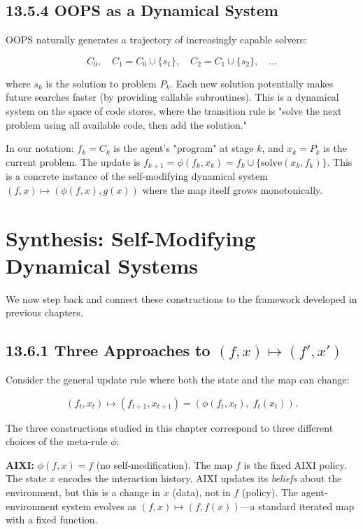 \subsection{13.5.4 OOPS as a Dynamical System}

OOPS naturally generates a trajectory of increasingly capable solvers:

\[C_0, \quad C_1 = C_0 \cup \{ s_1\} , \quad C_2 = C_1 \cup \{ s_2\} , \quad \ldots\]

where $s_k$ is the solution to problem $P_k$. Each new solution potentially makes future searches faster (by providing callable subroutines). This is a dynamical system on the space of code stores, where the transition rule is "solve the next problem using all available code, then add the solution."

In our notation: $f_k = C_k$ is the agent's "program" at stage $k$, and $x_k = P_k$ is the current problem. The update is $f_{k+1} = \phi(f_k, x_k) = f_k \cup \{ \text{solve}(x_k, f_k)\} $. This is a concrete instance of the self-modifying dynamical system $(f, x) \mapsto (\phi(f,x), g(x))$ where the map itself grows monotonically.



\section{Synthesis: Self-Modifying Dynamical Systems}

We now step back and connect these constructions to the framework developed in previous chapters.

\subsection{13.6.1 Three Approaches to $(f, x) \mapsto (f', x')$}

Consider the general update rule where both the state and the map can change:

\[(f_t, x_t) \mapsto (f_{t+1}, x_{t+1}) = (\phi(f_t, x_t),\; f_t(x_t)).\]

The three constructions studied in this chapter correspond to three different choices of the meta-rule $\phi$:

\textbf{AIXI:} $\phi(f, x) = f$ (no self-modification). The map $f$ is the fixed AIXI policy. The state $x$ encodes the interaction history. AIXI updates its \textit{beliefs} about the environment, but this is a change in $x$ (data), not in $f$ (policy). The agent-environment system evolves as $(f, x) \mapsto (f, f(x))$---a standard iterated map with a fixed function.

